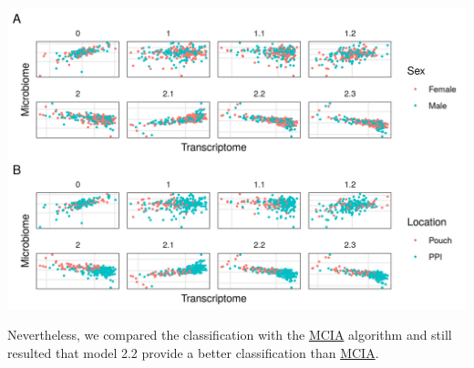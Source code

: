 \documentclass[
  12pt,
  a4paper,
  twoside,
  openright]{book}
\let\origfigure\figure
\let\endorigfigure\endfigure
\renewenvironment{figure}[1][2] {
    \expandafter\origfigure\expandafter[!htbp]
} {
    \endorigfigure
}
\begin{document}
\begin{figure}
\includegraphics[width=1\linewidth]{images/morgan_models} \caption[Models from inteRmodel in the Morgan's dataset. ]{Models from inteRmodel in the Morgan's dataset. First component of the transcriptome and microbiome of models on the Morgan's dataset. Model 0 without sample data. Model 1 to 1.2 with all the sample data in a single block and models 2.1 to 2.3 with sample data in several blocks. Panel A shows samples colored by sex and panel B by segment of the sample. There is no clear classification neither by location nor sex on any of the models.}\label{fig:morgan-models}
\end{figure}

Nevertheless, we compared the classification with the \protect\hyperlink{acronyms_MCIA}{MCIA} algorithm and still resulted that model 2.2 provide a better classification than \protect\hyperlink{acronyms_MCIA}{MCIA}.
\end{document}
